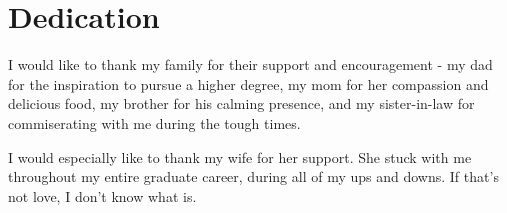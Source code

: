 \chapter[Dedication]{Dedication}

\begin{flushright}
I would like to thank my family for their support and encouragement - my dad for the inspiration to pursue a higher degree, my mom for her compassion and delicious food, my brother for his calming presence, and my sister-in-law for commiserating with me during the tough times.

I would especially like to thank my wife for her support. She stuck with me throughout my entire graduate career, during all of my ups and downs. If that's not love, I don't know what is.
\end{flushright}